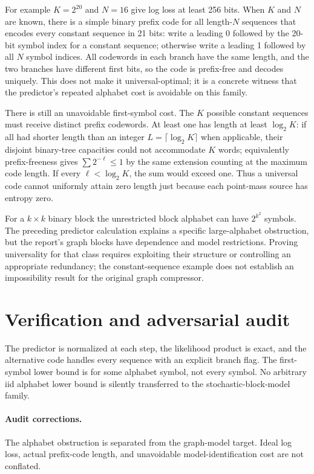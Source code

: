 \documentclass[11pt]{article}
\begin{document}
For example $K=2^{20}$ and $N=16$ give log loss at least 256 bits. When $K$ and $N$ are known, there is a simple binary prefix code for all length-$N$ sequences that encodes every constant sequence in 21 bits: write a leading 0 followed by the 20-bit symbol index for a constant sequence; otherwise write a leading 1 followed by all $N$ symbol indices. All codewords in each branch have the same length, and the two branches have different first bits, so the code is prefix-free and decodes uniquely. This does not make it universal-optimal; it is a concrete witness that the predictor's repeated alphabet cost is avoidable on this family.

There is still an unavoidable first-symbol cost. The $K$ possible constant sequences must receive distinct prefix codewords. At least one has length at least $\log_2 K$: if all had shorter length than an integer $L=\lceil\log_2 K\rceil$ when applicable, their disjoint binary-tree capacities could not accommodate $K$ words; equivalently prefix-freeness gives $\sum2^{-\ell}\le1$ by the same extension counting at the maximum code length. If every $\ell<\log_2K$, the sum would exceed one. Thus a universal code cannot uniformly attain zero length just because each point-mass source has entropy zero.

For a $k\times k$ binary block the unrestricted block alphabet can have $2^{k^2}$ symbols. The preceding predictor calculation explains a specific large-alphabet obstruction, but the report's graph blocks have dependence and model restrictions. Proving universality for that class requires exploiting their structure or controlling an appropriate redundancy; the constant-sequence example does not establish an impossibility result for the original graph compressor.
\section{Verification and adversarial audit}
The predictor is normalized at each step, the likelihood product is exact, and the alternative code handles every sequence with an explicit branch flag. The first-symbol lower bound is for some alphabet symbol, not every symbol. No arbitrary iid alphabet lower bound is silently transferred to the stochastic-block-model family.
\paragraph{Audit corrections.} The alphabet obstruction is separated from the graph-model target. Ideal log loss, actual prefix-code length, and unavoidable model-identification cost are not conflated.
\end{document}
